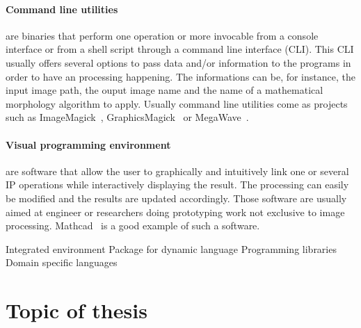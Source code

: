 \paragraph{Command line utilities} are binaries that perform one operation or more invocable from a console interface or
from a shell script through a command line interface (CLI). This CLI usually offers several options to pass data and/or
information to the programs in order to have an processing happening. The informations can be, for instance, the input
image path, the ouput image name and the name of a mathematical morphology algorithm to apply. Usually command line
utilities come as projects such as ImageMagick~\parencite{imagemagick.2021},
GraphicsMagick~\parencite{graphicsmagick.2021} or MegaWave~\parencite{froment.2012.megawave}.


\paragraph{Visual programming environment} are software that allow the user to graphically and intuitively link one or
several IP operations while interactively displaying the result. The processing can easily be modified and the results
are updated accordingly. Those software are usually aimed at engineer or researchers doing prototyping work not
exclusive to image processing. Mathcad~\parencite{mathcad.2019} is a good example of such a software.

Integrated environment
Package for dynamic language
Programming libraries
Domain specific languages


\section*{Topic of thesis}


